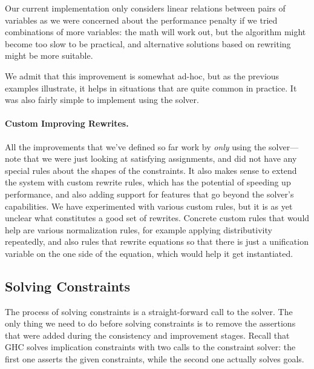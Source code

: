 \documentclass{sigplanconf}
\begin{document}
Our current implementation only considers linear relations between pairs
of variables as we were concerned about the performance penalty if
we tried combinations of more variables: the math will work out, but
the algorithm might become too slow to be practical, and alternative
solutions based on rewriting might be more suitable.

We admit that this improvement is somewhat ad-hoc, but as the previous
examples illustrate, it helps in situations that are quite common in
practice.  It was also fairly simple to implement using the solver.

\paragraph{Custom Improving Rewrites.}
All the improvements that we've defined so far work by {\em only} using
the solver---note that we were just looking at satisfying assignments,
and did not have any special rules about the shapes of the constraints.
It also makes sense to extend the system with custom rewrite rules,
which has the potential of speeding up performance, and also adding
support for features that go beyond the solver's capabilities.
We have experimented with various custom rules, but it is as yet
unclear what constitutes a good set of rewrites.  Concrete custom
rules that would help are various normalization rules, for example
applying distributivity repeatedly, and also rules that rewrite
equations so that there is just a unification variable on the one
side of the equation, which would help it get instantiated.


\subsection{Solving Constraints}

The process of solving constraints is a straight-forward call to the
solver.  The only thing we need to do before solving constraints is
to remove the assertions that were added during the consistency and
improvement stages.  Recall that GHC solves implication constraints
with two calls to the constraint solver: the first one asserts
the given constraints, while the second one actually solves goals.
\end{document}
